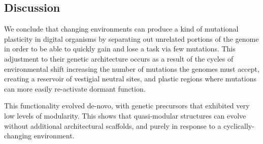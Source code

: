 \subsection{Discussion}

We conclude that changing environments can produce a kind of mutational plasticity in digital organisms by separating out unrelated portions of the genome in order to be able to quickly gain and lose a task via few mutations. This adjustment to their genetic architecture occurs as a result of the cycles of environmental shift increasing the number of mutations the genomes must accept, creating a reservoir of vestigial neutral sites, and plastic regions where mutations can more easily re-activate dormant function.

This functionality evolved de-novo, with genetic precursors that exhibited very low levels of modularity. This shows that quasi-modular structures can evolve without additional architectural scaffolds, and purely in response to a cyclically-changing environment. 